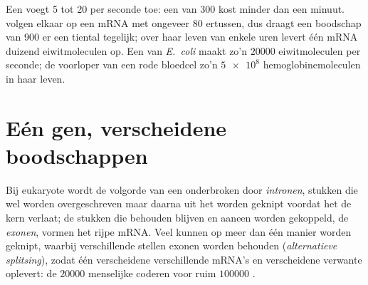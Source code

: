 \begin{example}\label{ex:g11:gene-expression:speed}
Een  voegt 5 tot 20  per seconde toe: een  van 300
 kost minder dan een minuut.  volgen elkaar op een
mRNA met ongeveer 80  ertussen, dus draagt een boodschap van
900  er een tiental tegelijk; over haar leven van enkele uren
levert één mRNA duizend eiwitmoleculen op. Een  van \emph{E.~coli}
maakt zo'n $\num{20000}$ eiwitmoleculen per seconde; de voorloper van een
rode bloedcel zo'n $\num{5e8}$ hemoglobinemoleculen in haar leven.
\end{example}

\section{Eén gen, verscheidene boodschappen}

\begin{proposition}\label{prop:g11:gene-expression:splicing}
Bij eukaryote  wordt de volgorde van een  onderbroken door
\emph{intronen}, stukken die wel worden overgeschreven maar
daarna uit het  worden geknipt voordat het de kern verlaat; de stukken
die behouden blijven en aaneen worden gekoppeld, de \emph{exonen}, vormen
het rijpe mRNA. Veel  kunnen op meer dan één manier worden geknipt,
waarbij verschillende stellen exonen worden behouden (\emph{alternatieve
splitsing}), zodat één  verscheidene verschillende mRNA's en
verscheidene verwante  oplevert: de $\num{20000}$ menselijke
 coderen voor ruim $\num{100000}$ .
\end{proposition}
\admitted

